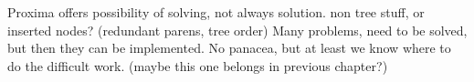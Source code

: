 Proxima offers possibility of solving, not always solution. non tree stuff, or inserted nodes? (redundant parens, tree order) Many problems, need to be solved, but then they can be implemented.
No panacea, but at least we know where to do the difficult work. (maybe this one belongs in previous chapter?)


%																
%																
%																
%
%



%																
%																
%																
%
%
%
